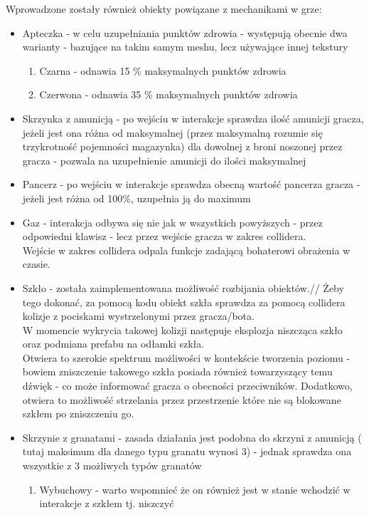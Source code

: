 Wprowadzone zostały również obiekty powiązane z mechanikami w grze:
\begin{itemize}
    \item Apteczka - w celu uzupełniania punktów zdrowia - występują obecnie dwa warianty - bazujące na takim samym meshu, lecz używające innej tekstury
    \begin{enumerate}
        \item Czarna - odnawia 15 \% maksymalnych punktów zdrowia
        \item Czerwona - odnawia 35 \% maksymalnych punktów zdrowia
    \end{enumerate}
    \item Skrzynka z amunicją - po wejściu w interakcje sprawdza ilość amunicji gracza, jeżeli jest ona różna od maksymalnej (przez maksymalną rozumie się trzykrotność pojemności magazynka) dla dowolnej z broni noszonej przez gracza - pozwala na uzupełnienie amunicji do ilości maksymalnej
    \item Pancerz - po wejściu w interakcje sprawdza obecną wartość pancerza gracza - jeżeli jest różna od 100\%, uzupełnia ją do maximum
    \item Gaz - interakcja odbywa się nie jak w wszystkich powyższych - przez odpowiedni klawisz - lecz przez wejście gracza w zakres collidera. \\
    Wejście w zakres collidera odpala funkcje zadającą bohaterowi obrażenia w czasie.
    \item Szkło - została zaimplementowana możliwość rozbijania obiektów.//
    Żeby tego dokonać, za pomocą kodu obiekt szkła sprawdza za pomocą collidera kolizje z pociskami wystrzelonymi przez gracza/bota.\\
    W momencie wykrycia takowej kolizji następuje eksplozja niszcząca szkło oraz podmiana prefabu na odłamki szkła.\\
    Otwiera to szerokie spektrum możliwości w kontekście tworzenia poziomu - bowiem zniszczenie takowego szkła posiada również towarzyszący temu dźwięk - co może informować gracza o obecności przeciwników.
    Dodatkowo, otwiera to możliwość strzelania przez przestrzenie które nie są blokowane szkłem po zniszczeniu go.
    \item Skrzynie z granatami - zasada działania jest podobna do skrzyni z amunicją ( tutaj maksimum dla danego typu granatu wynosi 3) - jednak sprawdza ona wszystkie z 3 możliwych typów granatów
    \begin{enumerate}
        \item Wybuchowy - warto wspomnieć że on również jest w stanie wchodzić w interakcje z szkłem tj. niszczyć

\end{enumerate}
\end{itemize}
